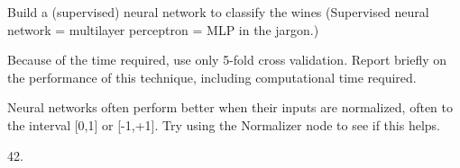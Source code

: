 \documentclass[
  coursecode={CMPE 251},
  assignmentname={Exercise \exercisenumber},
  studentnumber=20053722,
  name={Bryan Hoang}
]{
  ltxanswer%
}
\begin{document}
  \begin{questions}
    \question[2]{}
    Build a (supervised) neural network to classify the wines (Supervised neural network = multilayer perceptron = MLP in the jargon.)

    Because of the time required, use only 5-fold cross validation. Report briefly on the performance of this technique, including computational time required.

    Neural networks often perform better when their inputs are normalized, often to the interval [0,1] or [-1,+1]. Try using the Normalizer node to see if this helps.
    \begin{solution}
      42.
    \end{solution}
  \end{questions}
\end{document}
